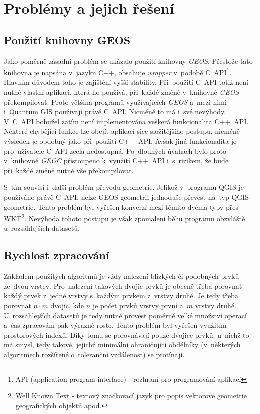 \chapter{Problémy a jejich řešení}
\label{6-problemy}

\section{Použití knihovny GEOS}
\label{geos problem}

Jako poměrně zásadní problém se ukázalo použití knihovny \textit{GEOS}. Přestože tato knihovna je napsána v~jazyku C++, obsahuje \textit{wrapper} v~podobě C~API\footnote{API
(application program interface) - rozhraní pro programování aplikací}. Hlavním důvodem toho je zajištění vyšší stability. Při~použití C~API totiž není nutné vlastní aplikaci,
která ho používá, při~každé změně v~knihovně \textit{GEOS} překompilovat. Proto většina programů využívajících \textit{GEOS} a~mezi nimi i~Quantum GIS používají právě C~API. 
Nicméně to má i~své nevýhody. V~C~API bohužel zatím není implementována veškerá funkcionalita C++~API. Některé chybějící funkce lze obejít aplikací sice složitějšího postupu,
nicméně výsledek je obdobný jako při~použití C++~API. Avšak jiná funkcionalita je pro~uživatele C~API zcela nedostupná. Po~dlouhých úvahách bylo proto v~knihovně \textit{GEOC}
přistoupeno k~využití C++~API i~s~rizikem, že bude při~každé změně nutné vše překompilovat. %

S~tím souvisí i~další problém převodu geometrie. Jelikož v~programu QGIS je používáno právě C~API, nelze GEOS geometrii jednoduše převést na~typ QGIS geometrie. Tento problém
byl vyřešen konverzí mezi těmito dvěma typy přes WKT\footnote{Well Known Text - textový značkovací jazyk pro popis vektorové geometrie geografických objektů apod.}. Nevýhoda
tohoto postupu je však zpomalení běhu programu obzvláště u~rozsáhlejších datasetů. %

\section{Rychlost zpracování}
\label{rychlost}

Základem použitých algoritmů je vždy nalezení blízkých či podobných prvků ze~dvou vrstev. Pro~nalezení takových dvojic prvků je obecně třeba porovnat každý prvek z~jedné
vrstvy s~každým prvkem z~vrstvy druhé. Je tedy třeba porovnat $n\cdot m$ dvojic, kde $n$ je počet prvků vrstvy první a~$m$ vrstvy druhé. U~rozsáhlejších datasetů je tedy
nutné provést poměrně velké množství operací a~čas zpracování pak výrazně roste. Tento problém byl vyřešen využitím prostorových indexů. Díky tomu se porovnávají pouze
dvojice prvků, u~nichž to má smysl, tedy takové, jejichž minimální ohraničující obdélníky (v~některých algoritmech rozšířené o~toleranční vzdálenost) se protínají.
